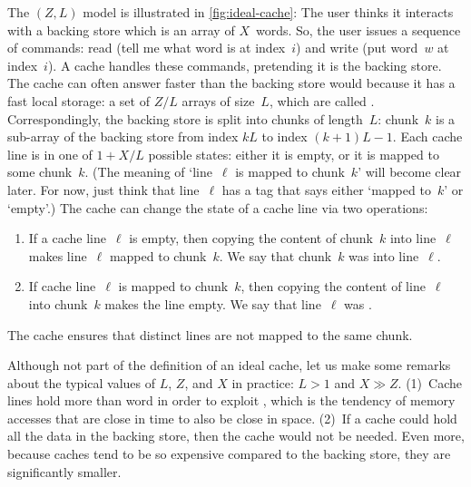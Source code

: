The $(Z,L)$  model is illustrated in \autoref{fig:ideal-cache}:
The user thinks it interacts with a backing store
  which is an array of $X$~words.
So, the user issues a sequence of commands:
  read (tell me what word is at index~$i$) and write (put word~$w$ at index~$i$).
A cache handles these commands, pretending it is the backing store.
The cache can often answer faster than the backing store would
  because it has a fast local storage:
  a set of $Z/L$ arrays of size~$L$, which are called .
Correspondingly, the backing store is split into chunks of length~$L$:
  chunk~$k$ is a sub-array of the backing store from index $kL$ to index $(k+1)L-1$.
Each cache line is in one of $1+X/L$ possible states:
  either it is empty, or it is mapped to some chunk~$k$.
(The meaning of `line~$\ell$ is mapped to chunk~$k$' will become clear later.
  For now, just think that line~$\ell$ has a tag that says
  either `mapped to~$k$' or `empty'.)
The cache can change the state of a cache line via two operations:
\begin{enumerate}
\item
  If a cache line~$\ell$ is empty,
  then copying the content of chunk~$k$ into line~$\ell$
    makes line~$\ell$ mapped to chunk~$k$.
  We say that chunk~$k$ was  into line~$\ell$.
\item
  If cache line~$\ell$ is mapped to chunk~$k$,
  then copying the content of line~$\ell$ into chunk~$k$ makes the line empty.
  We say that line~$\ell$ was .
\end{enumerate}
The cache ensures that distinct lines are not mapped to the same chunk.

Although not part of the definition of an ideal cache,
  let us make some remarks about the typical values of $L$, $Z$, and $X$ in practice:
  $L > 1$ and $X \gg Z$.
(1)~Cache lines hold more than word in order to exploit ,
  which is the tendency of memory accesses that are close in time
  to also be close in space.
(2)~If a cache could hold all the data in the backing store,
  then the cache would not be needed.
Even more, because caches tend to be so expensive compared to the backing store,
  they are significantly smaller.

